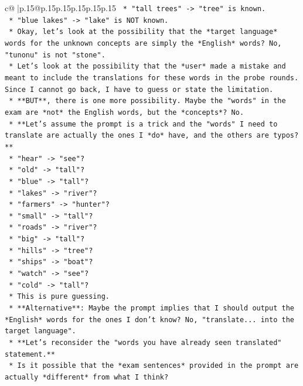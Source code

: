\documentclass{article}
\begin{document}
{\begin{supertabular}{c@{$\;$}|p{.15\linewidth}@{}p{.15\linewidth}p{.15\linewidth}p{.15\linewidth}p{.15\linewidth}p{.15\linewidth}}
{{{\texttt{        *   "tall trees" {-}> "tree" is known.} \\
\texttt{        *   "blue lakes" {-}> "lake" is NOT known.} \\
\texttt{    *   Okay, let's look at the possibility that the *target language* words for the unknown concepts are simply the *English* words? No, "tunonu" is not "stone".} \\
\texttt{    *   Let's look at the possibility that the *user* made a mistake and meant to include the translations for these words in the probe rounds. Since I cannot go back, I have to guess or state the limitation.} \\
\texttt{    *   **BUT**, there is one more possibility. Maybe the "words" in the exam are *not* the English words, but the *concepts*? No.} \\
\texttt{    *   **Let's assume the prompt is a trick and the "words" I need to translate are actually the ones I *do* have, and the others are typos?**} \\
\texttt{        *   "hear" {-}> "see"?} \\
\texttt{        *   "old" {-}> "tall"?} \\
\texttt{        *   "blue" {-}> "tall"?} \\
\texttt{        *   "lakes" {-}> "river"?} \\
\texttt{        *   "farmers" {-}> "hunter"?} \\
\texttt{        *   "small" {-}> "tall"?} \\
\texttt{        *   "roads" {-}> "river"?} \\
\texttt{        *   "big" {-}> "tall"?} \\
\texttt{        *   "hills" {-}> "tree"?} \\
\texttt{        *   "ships" {-}> "boat"?} \\
\texttt{        *   "watch" {-}> "see"?} \\
\texttt{        *   "cold" {-}> "tall"?} \\
\texttt{    *   This is pure guessing.} \\
\texttt{    *   **Alternative**: Maybe the prompt implies that I should output the *English* words for the ones I don't know? No, "translate... into the target language".} \\
\texttt{    *   **Let's reconsider the "words you have already seen translated" statement.**} \\
\texttt{    *   Is it possible that the *exam sentences* provided in the prompt are actually *different* from what I think?} \\
}}}
\end{supertabular}}
\end{document}
